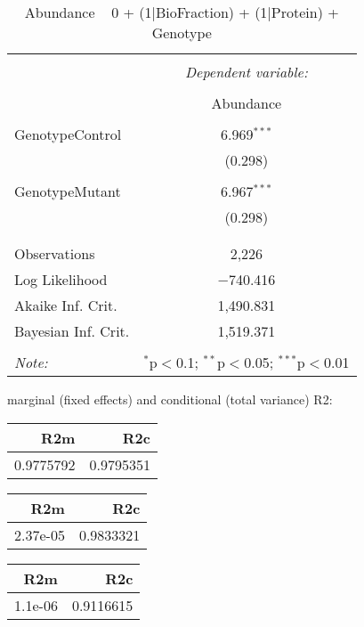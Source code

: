 \documentclass[11pt]{report}
\begin{document}
\begin{table}[!htbp] \centering 
  \caption{Abundance ~ 0 + (1|BioFraction) + (1|Protein) + Genotype} 
  \label{} 
\begin{tabular}{@{\extracolsep{5pt}}lc} 
\\[-1.8ex]\hline 
\hline \\[-1.8ex] 
 & \multicolumn{1}{c}{\textit{Dependent variable:}} \\ 
\cline{2-2} 
\\[-1.8ex] & Abundance \\ 
\hline \\[-1.8ex] 
 GenotypeControl & 6.969$^{***}$ \\ 
  & (0.298) \\ 
  & \\ 
 GenotypeMutant & 6.967$^{***}$ \\ 
  & (0.298) \\ 
  & \\ 
\hline \\[-1.8ex] 
Observations & 2,226 \\ 
Log Likelihood & $-$740.416 \\ 
Akaike Inf. Crit. & 1,490.831 \\ 
Bayesian Inf. Crit. & 1,519.371 \\ 
\hline 
\hline \\[-1.8ex] 
\textit{Note:}  & \multicolumn{1}{r}{$^{*}$p$<$0.1; $^{**}$p$<$0.05; $^{***}$p$<$0.01} \\ 
\end{tabular} 
\end{table} 
marginal (fixed effects) and conditional (total variance) R2:

\begin{tabular}{r|r}
\hline
R2m & R2c\\
\hline
0.9775792 & 0.9795351\\
\hline
\end{tabular}

\begin{tabular}{r|r}
\hline
R2m & R2c\\
\hline
2.37e-05 & 0.9833321\\
\hline
\end{tabular}

\begin{tabular}{r|r}
\hline
R2m & R2c\\
\hline
1.1e-06 & 0.9116615\\
\hline
\end{tabular}
\end{document}
